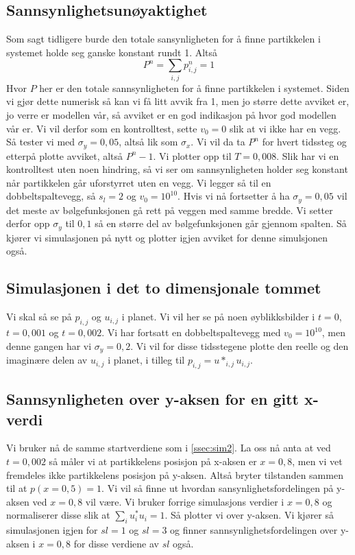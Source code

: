 \documentclass[reprint,english,notitlepage]{revtex4-2}  %
\begin{document}
\subsection{Sannsynlighetsunøyaktighet}
Som sagt tidligere burde den totale sansynligheten for å finne partikkelen i systemet holde seg ganske konstant rundt 1. Altså
$$
P^n=\sum_{i,j}p^n_{i,j}=1
$$
Hvor $P$ her er den totale sannsynligheten for å finne partikkelen i systemet.
\newline
Siden vi gjør  dette numerisk så kan vi få litt avvik fra 1, men jo større dette avviket er, jo verre er modellen vår, så avviket er en god indikasjon på hvor god modellen vår er.  Vi vil derfor som en kontrolltest, sette $v_0=0$ slik at vi ikke har en vegg. Så tester vi med $\sigma_y=0,05$, altså lik som $\sigma_x$. Vi vil da ta $P^n$ for hvert tidssteg og etterpå plotte avviket, altså $P^n-1$. Vi plotter opp til $T=0,008$. Slik har vi en kontrolltest uten noen hindring, så vi ser om sannsynligheten holder seg konstant når partikkelen går uforstyrret uten en vegg.
\newline Vi legger så til en dobbeltspaltevegg, så $s_l=2$ og $v_0=10^{10}$. Hvis vi nå fortsetter å ha $\sigma_y=0,05$ vil det meste av bølgefunksjonen gå rett på veggen med samme bredde. Vi setter derfor opp $\sigma_y$ til $0,1$ så en større del av bølgefunksjonen går gjennom spalten. Så kjører vi simulasjonen på nytt og plotter igjen avviket for denne simulsjonen også.
\subsection{Simulasjonen i det to dimensjonale tommet}\label{ssec:sim2}
Vi skal så se på $p_{i,j}$ og $u_{i,j}$ i planet. Vi vil her se på noen øyblikksbilder i $t=0$, $t=0,001$ og $t=0,002$. Vi har fortsatt en dobbeltspaltevegg med $v_0=10^{10}$, men denne gangen har vi $\sigma_y=0,2$.
Vi vil for disse tidsstegene plotte den reelle og den imaginære delen av $u_{i,j}$ i planet, i tilleg til $p_{i,j}=u*_{i,j}u_{i,j}$.
\subsection{Sannsynligheten over y-aksen for en gitt x-verdi}
Vi bruker nå de samme startverdiene som i \autoref{ssec:sim2}. La oss nå anta at ved $t=0,002$ så måler vi at partikkelens posisjon på x-aksen er $x=0,8$, men vi vet fremdeles ikke partikkelens posisjon på y-aksen. Altså bryter tilstanden sammen til at $p(x=0,5)=1$. Vi vil så finne ut hvordan sansynlighetsfordelingen på y-aksen ved $x=0,8$ vil være. Vi bruker forrige simulasjons verdier i $x=0,8$ og normaliserer disse slik at $\sum_{i}u^*_iu_i=1$. Så plotter vi over y-aksen. Vi kjører så simulasjonen igjen for $sl=1$ og $sl=3$ og finner sannsynlighetsfordelingen over y-aksen i $x=0,8$ for disse verdiene av $sl$ også. 
\end{document}
